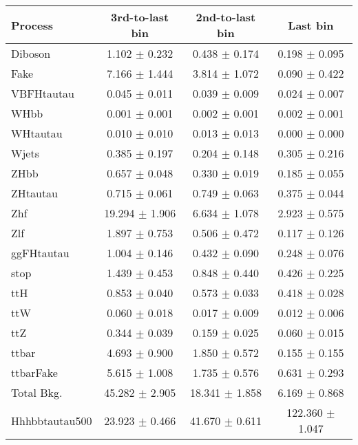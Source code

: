 \begin{tabular}{lccc}
  \toprule
  Process & 3rd-to-last bin & 2nd-to-last bin & Last bin \\
  \midrule
  Diboson &	1.102	$\pm$ 0.232	& 0.438	$\pm$ 0.174	& 0.198	$\pm$ 0.095 \\
  Fake &	7.166	$\pm$ 1.444	& 3.814	$\pm$ 1.072	& 0.090	$\pm$ 0.422 \\
  VBFHtautau &	0.045	$\pm$ 0.011	& 0.039	$\pm$ 0.009	& 0.024	$\pm$ 0.007 \\
  WHbb &	0.001	$\pm$ 0.001	& 0.002	$\pm$ 0.001	& 0.002	$\pm$ 0.001 \\
  WHtautau &	0.010	$\pm$ 0.010	& 0.013	$\pm$ 0.013	& 0.000	$\pm$ 0.000 \\
  Wjets &	0.385	$\pm$ 0.197	& 0.204	$\pm$ 0.148	& 0.305	$\pm$ 0.216 \\
  ZHbb &	0.657	$\pm$ 0.048	& 0.330	$\pm$ 0.019	& 0.185	$\pm$ 0.055 \\
  ZHtautau &	0.715	$\pm$ 0.061	& 0.749	$\pm$ 0.063	& 0.375	$\pm$ 0.044 \\
  Zhf &		19.294	$\pm$ 1.906	& 6.634	$\pm$ 1.078	& 2.923	$\pm$ 0.575 \\
  Zlf &		1.897	$\pm$ 0.753	& 0.506	$\pm$ 0.472	& 0.117	$\pm$ 0.126 \\
  ggFHtautau &	1.004	$\pm$ 0.146	& 0.432	$\pm$ 0.090	& 0.248	$\pm$ 0.076 \\
  stop &	1.439	$\pm$ 0.453	& 0.848	$\pm$ 0.440	& 0.426	$\pm$ 0.225 \\
  ttH &		0.853	$\pm$ 0.040	& 0.573	$\pm$ 0.033	& 0.418	$\pm$ 0.028 \\
  ttW &		0.060	$\pm$ 0.018	& 0.017	$\pm$ 0.009	& 0.012	$\pm$ 0.006 \\
  ttZ &		0.344	$\pm$ 0.039	& 0.159	$\pm$ 0.025	& 0.060	$\pm$ 0.015 \\
  ttbar &	4.693	$\pm$ 0.900	& 1.850	$\pm$ 0.572	& 0.155	$\pm$ 0.155 \\
  ttbarFake &	5.615	$\pm$ 1.008	& 1.735	$\pm$ 0.576	& 0.631	$\pm$ 0.293 \\
  \midrule
  Total Bkg. &  45.282	$\pm$ 2.905	& 18.341 $\pm$ 1.858	& 6.169	$\pm$ 0.868 \\
  \midrule
  Hhhbbtautau500 &	23.923	$\pm$ 0.466	& 41.670	$\pm$ 0.611	& 122.360	$\pm$ 1.047 \\
  \bottomrule
\end{tabular}
